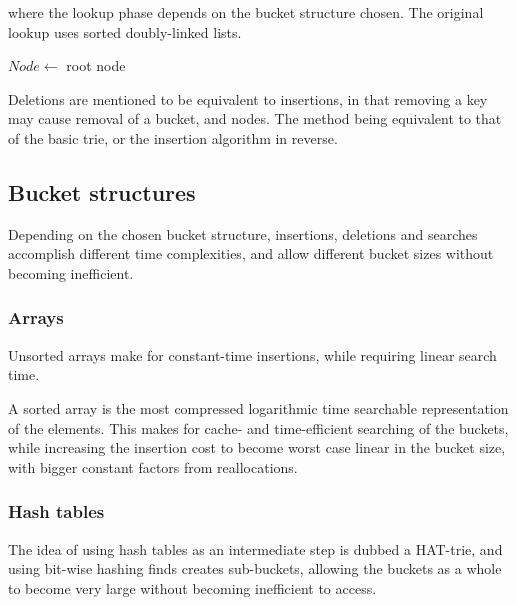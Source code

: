 \documentclass[11pt,a4paper]{article}
\begin{document}
where the lookup phase depends on the bucket structure chosen. The original
lookup uses sorted doubly-linked lists.

\begin{algorithm}[H]
    \caption{$k$\FuncSty{)}}

    $Node \leftarrow$  root node\;
\end{algorithm}

Deletions are mentioned to be equivalent to insertions, in that removing a key
may cause removal of a bucket, and nodes. The method being equivalent to that
of the basic trie, or the insertion algorithm in reverse.

\subsection{Bucket structures}
Depending on the chosen bucket structure, insertions, deletions and searches
accomplish different time complexities, and allow different bucket sizes
without becoming inefficient.

\subsubsection{Arrays}
Unsorted arrays make for constant-time insertions, while
requiring linear search time.

A sorted array is the most compressed logarithmic time searchable
representation of the elements. This makes for cache- and time-efficient
searching of the buckets, while increasing the insertion cost to become worst
case linear in the bucket size, with bigger constant factors from
reallocations.




\subsubsection{Hash tables}
The idea of using hash tables as an intermediate step is dubbed a HAT-trie,
and using bit-wise hashing finds creates sub-buckets, allowing the buckets
as a whole to become very large without becoming inefficient to access.
\end{document}
